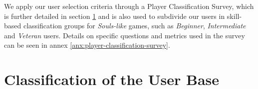 We apply our user selection criteria through a Player Classification Survey, which is further detailed in section \ref{sec:user-base-classification} and is also used to subdivide our users in skill-based classification groups for \emph{Souls-like} games, such as \emph{Beginner}, \emph{Intermediate} and \emph{Veteran} users. Details on specific questions and metrics used in the survey can be seen in annex \ref{anx:player-classification-survey}.


\section{Classification of the User Base}
\label{sec:user-base-classification}






